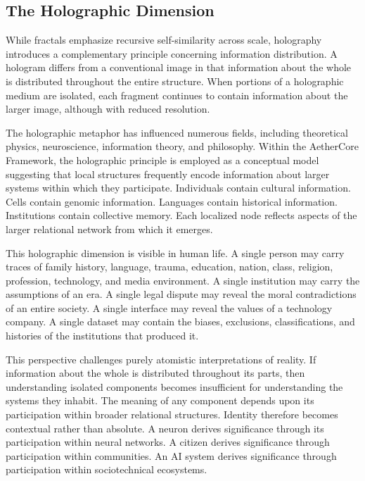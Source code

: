 \documentclass[12pt]{article}
\begin{document}
\subsection{The Holographic Dimension}

While fractals emphasize recursive self-similarity across scale, holography introduces a complementary principle concerning information distribution. A hologram differs from a conventional image in that information about the whole is distributed throughout the entire structure. When portions of a holographic medium are isolated, each fragment continues to contain information about the larger image, although with reduced resolution.

The holographic metaphor has influenced numerous fields, including theoretical physics, neuroscience, information theory, and philosophy. Within the AetherCore Framework, the holographic principle is employed as a conceptual model suggesting that local structures frequently encode information about larger systems within which they participate. Individuals contain cultural information. Cells contain genomic information. Languages contain historical information. Institutions contain collective memory. Each localized node reflects aspects of the larger relational network from which it emerges.

This holographic dimension is visible in human life. A single person may carry traces of family history, language, trauma, education, nation, class, religion, profession, technology, and media environment. A single institution may carry the assumptions of an era. A single legal dispute may reveal the moral contradictions of an entire society. A single interface may reveal the values of a technology company. A single dataset may contain the biases, exclusions, classifications, and histories of the institutions that produced it.

This perspective challenges purely atomistic interpretations of reality. If information about the whole is distributed throughout its parts, then understanding isolated components becomes insufficient for understanding the systems they inhabit. The meaning of any component depends upon its participation within broader relational structures. Identity therefore becomes contextual rather than absolute. A neuron derives significance through its participation within neural networks. A citizen derives significance through participation within communities. An AI system derives significance through participation within sociotechnical ecosystems.
\end{document}
